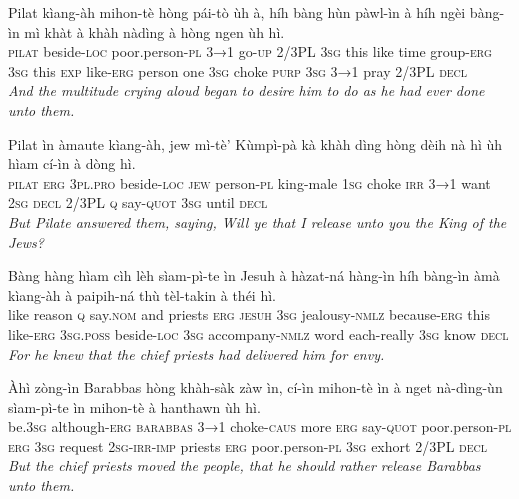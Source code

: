 \documentclass[11pt,a4paper]{article}
\begin{document}
\begin{exe}
\gll Pilat kìang-àh mihon-tè hòng pái-tò ùh à, híh bàng hùn pàwl-ìn à híh ngèi bàng-ìn mì khàt à khàh nàdìng à hòng ngen ùh hì. \\
     \textsc{pilat} beside-\textsc{loc} poor.person-\textsc{pl} \textsc{3→1} go-\textsc{up} 2/3PL \textsc{3sg} this like time group-\textsc{erg} \textsc{3sg} this \textsc{exp} like-\textsc{erg} person one \textsc{3sg} choke \textsc{purp} \textsc{3sg} \textsc{3→1} pray 2/3PL \textsc{decl} \\
\glt \textcolor{kjvcolor}{\textit{And the multitude crying aloud began to desire him to do as he had ever done unto them.}}

\gll Pilat ìn àmaute kìang-àh, jew mì-tè' Kùmpì-pà kà khàh dìng hòng dèih nà hì ùh hìam cí-ìn à dòng hì. \\
     \textsc{pilat} \textsc{erg} \textsc{3pl}.\textsc{pro} beside-\textsc{loc} \textsc{jew} person-\textsc{pl} king-male \textsc{1sg} choke \textsc{irr} \textsc{3→1} want \textsc{2sg} \textsc{decl} 2/3PL \textsc{q} say-\textsc{quot} \textsc{3sg} until \textsc{decl} \\
\glt \textcolor{kjvcolor}{\textit{But Pilate answered them, saying, Will ye that I release unto you the King of the Jews?}}

\gll Bàng hàng hìam cìh lèh sìam-pì-te ìn Jesuh à hàzat-ná hàng-ìn híh bàng-ìn àmà kìang-àh à paipih-ná thù tèl-takin à théi hì. \\
     like reason \textsc{q} say.\textsc{nom} and priests \textsc{erg} \textsc{jesuh} \textsc{3sg} jealousy-\textsc{nmlz} because-\textsc{erg} this like-\textsc{erg} \textsc{3sg}.\textsc{poss} beside-\textsc{loc} \textsc{3sg} accompany-\textsc{nmlz} word each-really \textsc{3sg} know \textsc{decl} \\
\glt \textcolor{kjvcolor}{\textit{For he knew that the chief priests had delivered him for envy.}}

\gll Àhì zòng-ìn Barabbas hòng khàh-sàk zàw ìn, cí-ìn mihon-tè ìn à nget nà-dìng-ùn sìam-pì-te ìn mihon-tè à hanthawn ùh hì. \\
     be.\textsc{3sg} although-\textsc{erg} \textsc{barabbas} \textsc{3→1} choke-\textsc{caus} more \textsc{erg} say-\textsc{quot} poor.person-\textsc{pl} \textsc{erg} \textsc{3sg} request \textsc{2sg}-\textsc{irr}-\textsc{imp} priests \textsc{erg} poor.person-\textsc{pl} \textsc{3sg} exhort 2/3PL \textsc{decl} \\
\glt \textcolor{kjvcolor}{\textit{But the chief priests moved the people, that he should rather release Barabbas unto them.}}


\end{exe}
\end{document}
